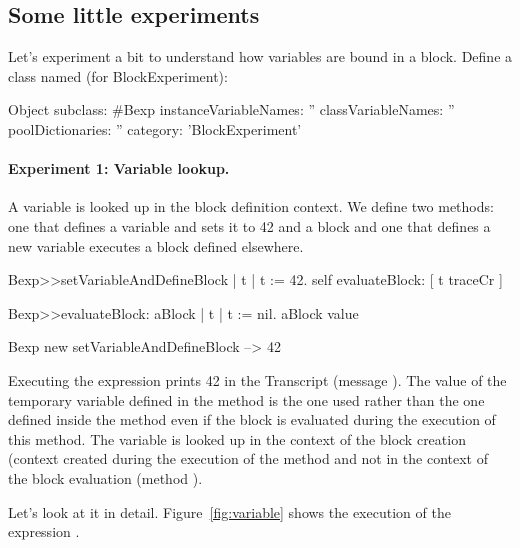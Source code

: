 \documentclass[a4paper,10pt,twoside]{book}
\begin{document}


\subsection{Some little experiments}
Let's experiment a bit to understand how variables are bound in a block. Define a class named  (for BlockExperiment):

\begin{code}{}
Object subclass: #Bexp
	instanceVariableNames: ''
	classVariableNames: ''
	poolDictionaries: ''
	category: 'BlockExperiment'
\end{code}


\paragraph{Experiment 1: Variable lookup.} A variable is looked up in the block definition context. We define two methods: one that defines a variable  and sets it to 42 and a block and one that defines a new variable executes a block defined elsewhere.



\begin{code}{}
Bexp>>setVariableAndDefineBlock
	| t |
	t := 42.
	self evaluateBlock: [ t traceCr ]
	
Bexp>>evaluateBlock: aBlock
	| t |
	t := nil.
	aBlock value	

Bexp new setVariableAndDefineBlock 
--> 42
\end{code}


Executing the  expression prints 42 in the Transcript (message ). The value of the temporary variable  defined in the  method is the one used rather than the one defined inside the method  even if the block is evaluated during the execution of this method. The variable  is  looked up in the context of the block creation (context created during the execution of the method  and not in the context of the block evaluation 
(method ).

Let's look at it in detail. Figure~\ref{fig:variable} shows the execution of the expression . 
\end{document}

